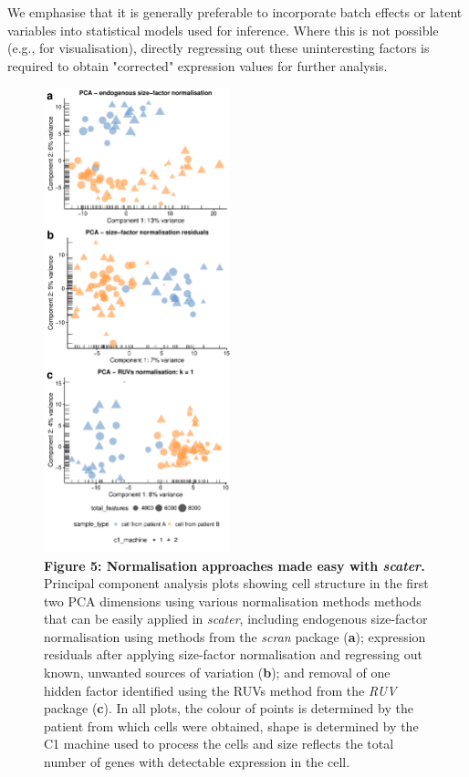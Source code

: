 \documentclass{bioinfo}
\begin{document}

We emphasise that it is generally preferable to incorporate batch effects or latent variables into statistical models used for inference. Where this is not possible (e.g., for visualisation), directly regressing out these uninteresting factors is required to obtain "corrected" expression values for further analysis.

\begin{figure}[!tpb]%
\centerline{\includegraphics[width=0.48\textwidth]{figures/figure5.pdf}}
\caption{\textbf{Figure 5: Normalisation approaches made easy with
\emph{scater}.} Principal component analysis plots showing cell
structure in the first two PCA dimensions using various normalisation
methods methods that can be easily applied in \emph{scater}, including
endogenous size-factor normalisation using methods from the \emph{scran}
package (\textbf{a}); expression residuals after applying size-factor
normalisation and regressing out known, unwanted sources of variation
(\textbf{b}); and removal of one hidden factor identified using
the RUVs method from the \emph{RUV} package (\textbf{c}). In all plots,
the colour of points is determined by the patient from which cells were
obtained, shape is determined by the C1 machine used to process the
cells and size reflects the total number of genes with detectable
expression in the cell.}\label{fig:05}
\end{figure}
\end{document}
